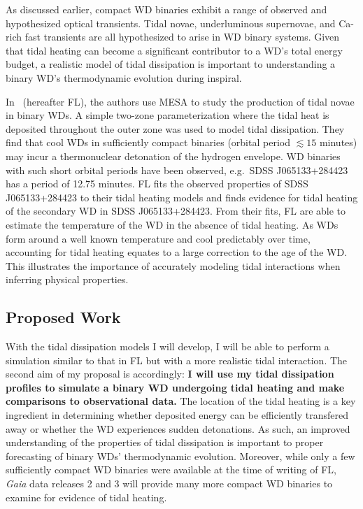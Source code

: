 \documentclass[12pt,
        usenames, %
        dvipsnames %
    ]{article}
\begin{document}
As discussed earlier, compact WD binaries exhibit a range of observed and
hypothesized optical transients. Tidal novae\cite{tidal_novae}, underluminous
supernovae\cite{underlum}, and Ca-rich fast transients\cite{carich} are all
hypothesized to arise in WD binary systems. Given that tidal heating can become
a significant contributor to a WD's total energy budget, a realistic model of
tidal dissipation is important to understanding a binary WD's thermodynamic
evolution during inspiral.

In~\cite{tidal_novae} (hereafter FL), the authors use MESA to study the
production of tidal novae in binary WDs. A simple two-zone parameterization
where the tidal heat is deposited throughout the outer zone was used to model
tidal dissipation. They find that cool WDs in sufficiently compact binaries
(orbital period $\lesssim 15$ minutes) may incur a thermonuclear detonation of
the hydrogen envelope. WD binaries with such short orbital periods have been
observed, e.g.\ SDSS J065133+284423 has a period of 12.75 minutes\cite{12min}.
FL fits the observed properties of SDSS J065133+284423 to their tidal heating
models and finds evidence for tidal heating of the secondary WD in SDSS
J065133+284423. From their fits, FL are able to estimate the temperature of the
WD in the absence of tidal heating. As WDs form around a well known temperature
and cool predictably over time, accounting for tidal heating equates to a large
correction to the age of the WD\@. This illustrates the importance of accurately
modeling tidal interactions when inferring physical properties.

\subsection{Proposed Work}

With the tidal dissipation models I will develop, I will be able to perform a
simulation similar to that in FL but with a more realistic tidal interaction.
The second aim of my proposal is accordingly: \textbf{I will use my tidal
dissipation profiles to simulate a binary WD undergoing tidal heating and make
comparisons to observational data.} The location of the tidal heating is a key
ingredient in determining whether deposited energy can be efficiently transfered
away or whether the WD experiences sudden detonations. As such, an improved
understanding of the properties of tidal dissipation is important to proper
forecasting of binary WDs' thermodynamic evolution. Moreover, while only a few
sufficiently compact WD binaries were available at the time of writing of FL,
\emph{Gaia} data releases 2 and 3 will provide many more compact WD binaries to
examine for evidence of tidal heating.
\end{document}
